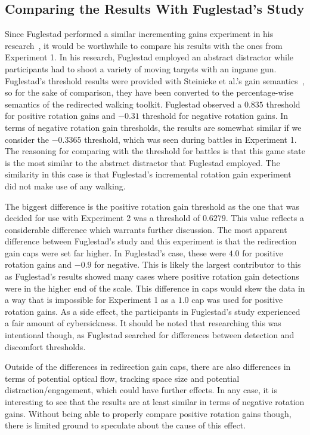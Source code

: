 \subsection{Comparing the Results With Fuglestad's Study}
Since Fuglestad performed a similar incrementing gains experiment in his research~\cite{fuglestad2018redirected}, it would be worthwhile to compare his results with the ones from Experiment 1. In his research, Fuglestad employed an abstract distractor while participants had to shoot a variety of moving targets with an ingame gun. Fuglestad's threshold results were provided with Steinicke et al.'s gain semantics~\cite{5072212}, so for the sake of comparison, they have been converted to the percentage-wise semantics of the redirected walking toolkit. Fuglestad observed a $0.835$ threshold for positive rotation gains and $-0.31$ threshold for negative rotation gains. In terms of negative rotation gain thresholds, the results are somewhat similar if we consider the $-0.3365$ threshold, which was seen during battles in Experiment 1. The reasoning for comparing with the threshold for battles is that this game state is the most similar to the abstract distractor that Fuglestad employed. The similarity in this case is that Fuglestad's incremental rotation gain experiment did not make use of any walking. 

The biggest difference is the positive rotation gain threshold as the one that was decided for use with Experiment 2 was a threshold of $0.6279$. This value reflects a considerable difference which warrants further discussion. The most apparent difference between Fuglestad's study and this experiment is that the redirection gain caps were set far higher. In Fuglestad's case, these were $4.0$ for positive rotation gains and $-0.9$ for negative. This is likely the largest contributor to this as Fuglestad's results showed many cases where positive rotation gain detections were in the higher end of the scale. This difference in caps would skew the data in a way that is impossible for Experiment 1 as a $1.0$ cap was used for positive rotation gains. As a side effect, the participants in Fuglestad's study experienced a fair amount of cybersickness. It should be noted that researching this was intentional though, as Fuglestad searched for differences between detection and discomfort thresholds.

Outside of the differences in redirection gain caps, there are also differences in terms of potential optical flow, tracking space size and potential distraction/engagement, which could have further effects. In any case, it is interesting to see that the results are at least similar in terms of negative rotation gains. Without being able to properly compare positive rotation gains though, there is limited ground to speculate about the cause of this effect. 

